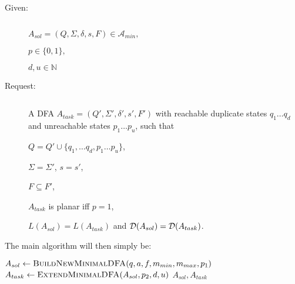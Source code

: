 \begin{definition}[ExtendMinimalDFA] $ $
	\begin{description}
		
		\item[Given:] $ $
		
		$A_{sol} = (Q, \Sigma, \delta, s, F) \in \mathcal{A}_{min},$
		
		$p \in \{0,1\},$
		
		$d, u \in \mathbb{N}$
		\item[Request:] $ $
		
		A DFA $A_{task} = (Q', \Sigma', \delta', s', F')$ with reachable duplicate states $q_1 \ldots q_d$ and unreachable states $p_1 \ldots p_u$, such that
		
		$Q = Q' \cup \{ q_1, \ldots q_d, p_1 \ldots p_u \}$,
		
		$\Sigma = \Sigma'$, $s = s'$,
		
		$F \subseteq F'$,
		
		$A_{task}$ is planar iff $p = 1$,
		
		$L(A_{sol}) = L(A_{task})$ and $\mathcal{D}(A_{sol}) = \mathcal{D}(A_{task})$.
	\end{description}
\end{definition}

\noindent The main algorithm will then simply be:
\vspace{0.2cm}
\begin{algorithmic}[1]
	\State $A_{sol} \gets \textsc{BuildNewMinimalDFA}(q, a, f, m_{min}, m_{max}, p_1)$
	\State $A_{task} \gets \textsc{ExtendMinimalDFA}(A_{sol}, p_2, d, u)$
	\State \Return $A_{sol}, A_{task}$
	\EndFunction
\end{algorithmic}


